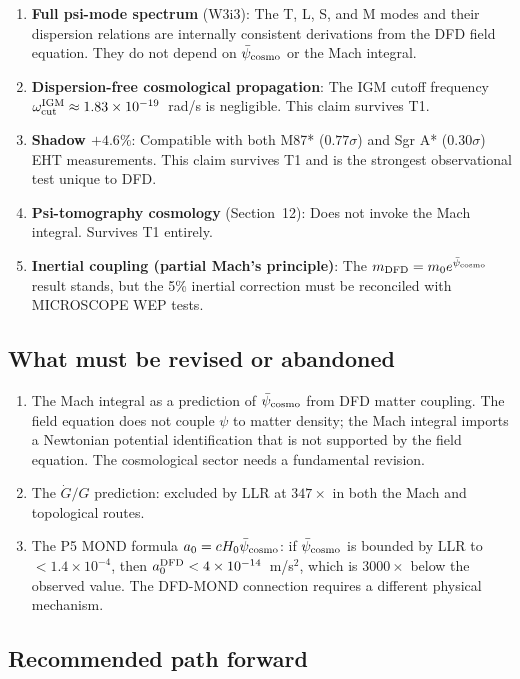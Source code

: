 \documentclass[11pt]{article}
\newcommand{\ee}[1]{\times 10^{#1}}
\newcommand{\psicosmo}{\bar{\psi}_{\rm cosmo}}
\begin{document}
\begin{enumerate}
\item \textbf{Full psi-mode spectrum} (W3i3): The T, L, S, and M modes and their
  dispersion relations are internally consistent derivations from the DFD field
  equation. They do not depend on $\psicosmo$ or the Mach integral.
\item \textbf{Dispersion-free cosmological propagation}: The IGM cutoff frequency
  $\omega_{\rm cut}^{\rm IGM} \approx 1.83\ee{-19}$~rad/s is negligible. This
  claim survives T1.
\item \textbf{Shadow $+4.6\%$}: Compatible with both M87* ($0.77\sigma$) and
  Sgr A* ($0.30\sigma$) EHT measurements. This claim survives T1 and is the
  strongest observational test unique to DFD.
\item \textbf{Psi-tomography cosmology} (Section~12): Does not invoke the Mach
  integral. Survives T1 entirely.
\item \textbf{Inertial coupling (partial Mach's principle)}: The $m_{\rm DFD}
  = m_0 e^{\psicosmo}$ result stands, but the 5\% inertial correction must be
  reconciled with MICROSCOPE WEP tests.
\end{enumerate}

\subsection{What must be revised or abandoned}

\begin{enumerate}
\item The Mach integral as a prediction of $\psicosmo$ from DFD matter coupling.
  The field equation does not couple $\psi$ to matter density; the Mach integral
  imports a Newtonian potential identification that is not supported by the field
  equation. The cosmological sector needs a fundamental revision.
\item The $\dot{G}/G$ prediction: excluded by LLR at $347\times$ in both the Mach
  and topological routes.
\item The P5 MOND formula $a_0 = cH_0\psicosmo$: if $\psicosmo$ is bounded
  by LLR to $< 1.4\ee{-4}$, then $a_0^{\rm DFD} < 4\ee{-14}$~m/s$^2$, which
  is $3000\times$ below the observed value. The DFD-MOND connection requires
  a different physical mechanism.
\end{enumerate}

\subsection{Recommended path forward}
\end{document}
